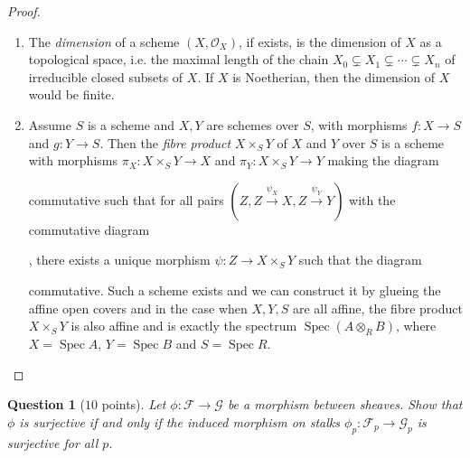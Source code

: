 \documentclass[12pt]{amsart}
\newcommand{\spec}{\operatorname{Spec}}
\newtheorem{question}{Question}
\begin{document}
\begin{proof}
\begin{enumerate}
	\item The \emph{dimension} of a scheme $(X,\mathcal{O}_X )$, if exists, is the dimension of $X$ as a topological space, i.e. the maximal length of the chain $X_0\subsetneq X_1\subsetneq\dotsb\subsetneq X_n$ of irreducible closed subsets of $X$. If $X$ is Noetherian, then the dimension of $X$ would be finite.
	\item Assume $S$ is a scheme and $X,Y$ are schemes over $S$, with morphisms $f\colon X\to S$ and $g\colon Y\to S$. Then the \emph{fibre product} $X\times_S Y$ of $X$ and $Y$ over $S$ is a scheme with morphisms $\pi_X\colon X\times_S Y\to X$ and $\pi_Y\colon X\times_S Y\to Y$ making the diagram 
	commutative such that for all pairs $(Z,Z\xrightarrow{\psi_X } X, Z\xrightarrow{\psi_Y } Y)$ with the commutative diagram , there exists a unique morphism $\psi\colon Z\to X\times_S Y$ such that the diagram  commutative. Such a scheme exists and we can construct it by glueing the affine open covers and in the case when $X,Y,S$ are all affine, the fibre product $X\times_S Y$ is also affine and is exactly the spectrum $\spec (A\otimes_R B)$, where $X=\spec A$, $Y=\spec B$ and $S=\spec R$.\qedhere
	\end{enumerate}
	\end{proof}

\begin{question}[$10$ points]
Let $\phi: \mathscr F \to  \mathscr G$ be a morphism between sheaves. Show that $\phi$ is surjective if and only if the induced morphism on stalks $\phi_p: \mathscr{F}_p \to  \mathscr{G}_p$ is surjective for all $p$.

\end{question}
\end{document}
